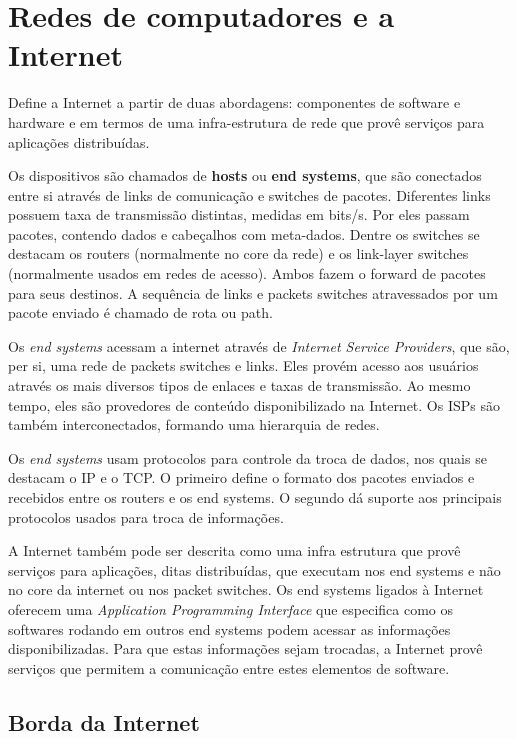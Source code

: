 \chapter{Redes de computadores e a Internet}

Define a Internet a partir de duas abordagens: componentes de software e hardware e em termos de uma infra-estrutura de rede que provê serviços para aplicações distribuídas.

Os dispositivos são chamados de \textbf{hosts} ou \textbf{end systems}, que são conectados entre si através de links de comunicação e switches de pacotes.
Diferentes links possuem taxa de transmissão distintas, medidas em bits/s. Por eles passam pacotes, contendo dados e cabeçalhos com meta-dados.
Dentre os switches se destacam os routers (normalmente no core da rede) e os link-layer switches (normalmente usados em redes de acesso).
Ambos fazem o forward de pacotes para seus destinos. A sequência de links e packets switches atravessados por um pacote enviado é chamado de rota ou path.

Os \emph{end systems} acessam a internet através de \emph{Internet Service Providers}, que são, per si, uma rede de packets switches e links.
Eles provém acesso aos usuários através os mais diversos tipos de enlaces e taxas de transmissão. Ao mesmo tempo, eles são provedores de conteúdo disponibilizado na Internet.
Os ISPs são também interconectados, formando uma hierarquia de redes.

Os \emph{end systems} usam protocolos para controle da troca de dados, nos quais se destacam o IP e o TCP. O primeiro define o formato dos pacotes enviados e recebidos entre os routers e os end systems. O segundo dá suporte aos principais protocolos usados para troca de informações.

A Internet também pode ser descrita como uma infra estrutura que provê serviços para aplicações, ditas distribuídas, que executam nos end systems e não no core da internet ou nos packet switches.
Os end systems ligados à Internet oferecem uma \emph{Application Programming Interface} que especifica como os softwares rodando em outros end systems podem acessar as informações disponibilizadas.
Para que estas informações sejam trocadas, a Internet provê serviços que permitem a comunicação entre estes elementos de software.

\section{Borda da Internet}

